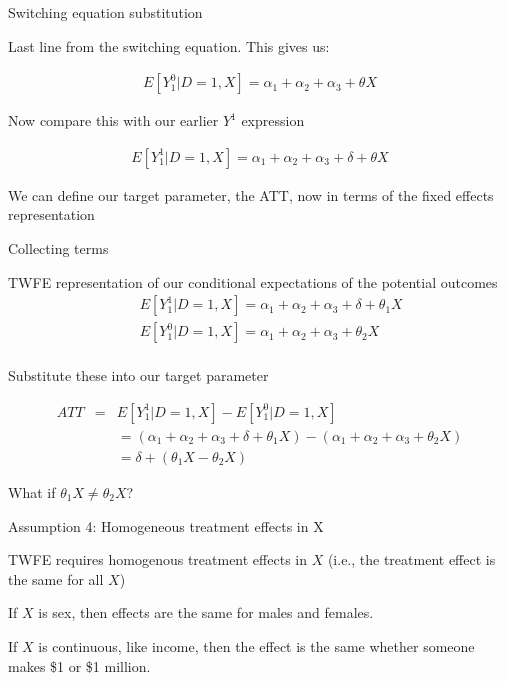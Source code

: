 \documentclass{beamer}
\begin{document}
\begin{frame}{Switching equation substitution}

Last line from the switching equation. This gives us:

\begin{eqnarray*}
E[Y^0_{1}|D=1,X] = \alpha_1  + \alpha_2 + \alpha_3 + \theta X
\end{eqnarray*}

Now compare this with our earlier $Y^1$ expression

\begin{eqnarray*}
E[Y^1_1|D=1,X] = \alpha_1 + \alpha_2 + \alpha_3 + \delta + \theta X
\end{eqnarray*}

We can define our target parameter, the ATT, now in terms of the fixed effects representation

\end{frame}


\begin{frame}{Collecting terms}

TWFE representation of our conditional expectations of the potential outcomes
\begin{eqnarray*}
&&E[Y^1_1|D=1,X] = \alpha_1 + \alpha_2 + \alpha_3 + \delta + \theta_1 X \\
&&E[Y^0_{1}|D=1,X] = \alpha_1  + \alpha_2 + \alpha_3 + \theta_2 X \\
\end{eqnarray*}

Substitute these into our target parameter

\begin{eqnarray*}
ATT &=& E[Y^1_1|D=1,X]  - E[Y^0_{1}|D=1,X]   \\
&&=(\alpha_1 + \alpha_2 + \alpha_3 + \delta + \theta_1 X) - ( \alpha_1  + \alpha_2 + \alpha_3 + \theta_2 X )\\
&&=\delta + (\theta_1 X - \theta_2 X)
\end{eqnarray*}

\bigskip

What if $\theta_1 X \neq \theta_2 X$?

\end{frame}

\begin{frame}{Assumption 4: Homogeneous treatment effects in X}


TWFE requires homogenous treatment effects in $X$ (i.e., the treatment effect is the same for all $X$)

\bigskip

If $X$ is sex, then effects are the same for males and females.

\bigskip

  If $X$ is continuous, like income, then the effect is the same whether someone makes \$1 or \$1 million.

\end{frame}
\end{document}
